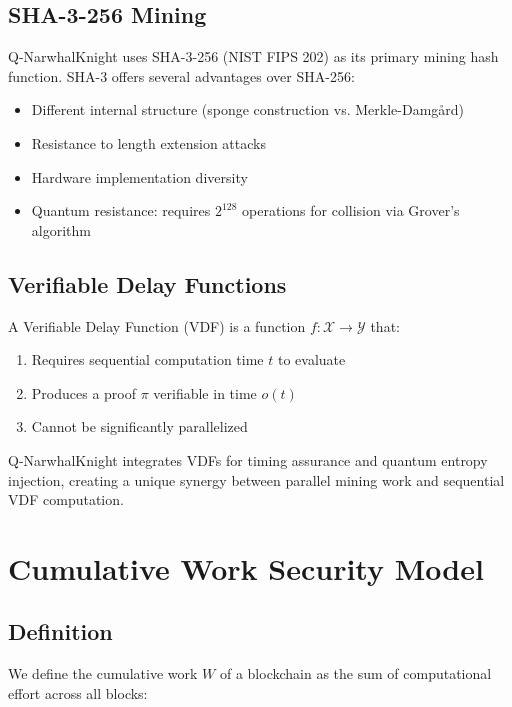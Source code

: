 \documentclass[11pt,a4paper]{article}
\begin{document}
\subsection{SHA-3-256 Mining}

Q-NarwhalKnight uses SHA-3-256 (NIST FIPS 202) as its primary mining hash function. SHA-3 offers several advantages over SHA-256:
\begin{itemize}
    \item Different internal structure (sponge construction vs. Merkle-Damg\aa rd)
    \item Resistance to length extension attacks
    \item Hardware implementation diversity
    \item Quantum resistance: requires $2^{128}$ operations for collision via Grover's algorithm
\end{itemize}

\subsection{Verifiable Delay Functions}

A Verifiable Delay Function (VDF) is a function $f: \mathcal{X} \rightarrow \mathcal{Y}$ that:
\begin{enumerate}
    \item Requires sequential computation time $t$ to evaluate
    \item Produces a proof $\pi$ verifiable in time $o(t)$
    \item Cannot be significantly parallelized
\end{enumerate}

Q-NarwhalKnight integrates VDFs for timing assurance and quantum entropy injection, creating a unique synergy between parallel mining work and sequential VDF computation.

\section{Cumulative Work Security Model}

\subsection{Definition}

We define the cumulative work $W$ of a blockchain as the sum of computational effort across all blocks:
\end{document}

